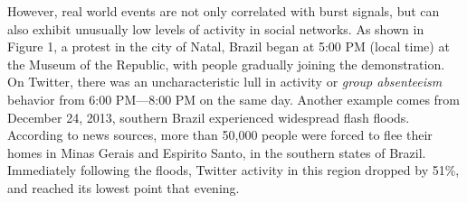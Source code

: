 \documentclass[conference]{IEEEtran}
\begin{document}
However, real world events are not only correlated with burst signals, but can also exhibit unusually low levels of activity in social networks.
As shown in Figure 1, a protest in the city of Natal, Brazil began at 5:00 PM (local time) at the Museum of the Republic, with people gradually joining the demonstration. %
On Twitter, there was an uncharacteristic lull in activity or {\it group absenteeism} behavior from 6:00 PM---8:00 PM on the same day.
Another example comes from December 24, 2013, southern Brazil experienced widespread flash floods. According to news sources, more than 50,000 people were forced to flee their homes in Minas Gerais and Espirito Santo, in the southern states of Brazil. Immediately following the floods, Twitter activity in this region dropped by 51\%, and reached its lowest point that evening.
\end{document}
